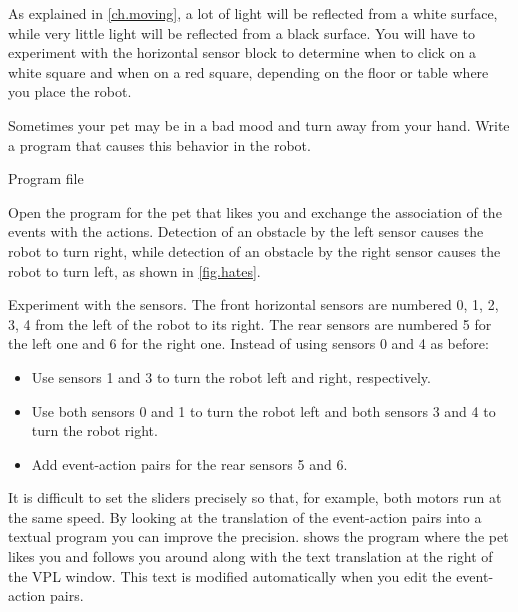 As explained in \cref{ch.moving}, a lot of light will be reflected
from a white surface, while very little light will be reflected from a
black surface.
You will have to experiment with the horizontal sensor block to determine when to click on a white square and when on a red square, depending on the floor or table where you place the robot.





Sometimes your pet may be in a bad mood and turn away from your hand.
Write a program that causes this behavior in the robot.

{\raggedleft \hfill Program file }

Open the program for the pet that likes you and exchange the association
of the events with the actions. Detection of an obstacle by the left
sensor causes the robot to turn right, while detection of an obstacle by
the right sensor causes the robot to turn left, as shown in \cref{fig.hates}.


{
Experiment with the sensors.
The front horizontal sensors are numbered 0, 1, 2, 3, 4 from the left of the robot to its right.
The rear sensors are numbered 5 for the left one and 6 for the right one.
Instead of using sensors 0 and 4 as before:
\begin{itemize}[noitemsep,nosep,leftmargin=*]
\item Use sensors 1 and 3 to turn the robot left and right,
respectively.
\item Use both sensors 0 and 1 to turn the robot left and both sensors 3
and 4 to turn the robot right.
\item Add event-action pairs for the rear sensors 5 and 6.
\end{itemize}
}

\label{s.sliders}

It is difficult to set the sliders precisely so that, for example, both
motors run at the same speed. By looking at the translation of the
event-action pairs into a textual program you can improve the precision.
 shows the program where the pet likes you and follows you around along with the text translation at the right of the VPL window.
This text is modified automatically when you edit the event-action pairs.

